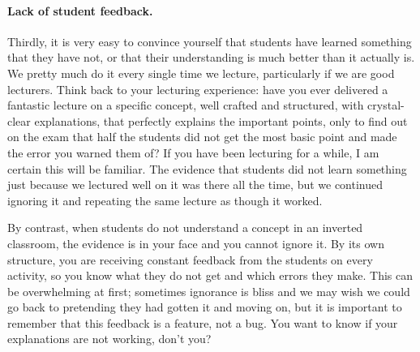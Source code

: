 \documentclass[11pt]{article}
\begin{document}
	\paragraph{Lack of student feedback.}
	Thirdly, it is very easy to convince yourself that students have learned something
	that they have not, or that their understanding is much better than it
	actually is. We pretty much do it every single time we lecture, particularly
	if we are good lecturers. Think back to your lecturing experience: have you
	ever delivered a fantastic lecture on a specific concept, well crafted and structured,
	with crystal-clear explanations, that perfectly explains the important points,
	only to find out on the exam that half the students did not get the most basic
	point and made the error you warned them of? If you have been lecturing for a while,
	I am certain this will be familiar. The evidence that students did not learn something
	just because we lectured well on it was there all the time, but we continued
	ignoring it and repeating the same lecture as though it worked.

	{\baselineskip By contrast, when students do not understand a concept in an inverted classroom, the evidence is in your face and you cannot ignore it. By its own structure, you are receiving constant feedback from the students on every activity, so you know what they do not get and which errors they make. This can be overwhelming at first; sometimes ignorance is bliss and we may wish we could go back to pretending they had gotten it and moving on, but it is important to remember that this feedback is a feature, not a bug. You want to know if your explanations are not working, don't you?\\ }
\end{document}
